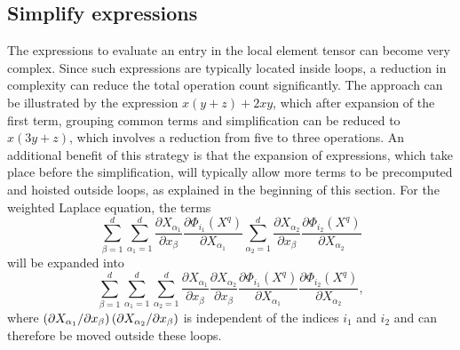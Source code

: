 \subsection{Simplify expressions}
\label{oelgaard-2:sec:simplify_expressions}
%
The expressions to evaluate an entry in the local element tensor can become
very complex. Since such expressions are typically located inside loops,
a reduction in complexity can reduce the total operation count significantly.
The approach can be illustrated by the expression
$x (y + z) + 2 x y$, which after expansion of the first term,
grouping common terms and simplification can be reduced to
$x (3 y + z)$, which involves a reduction from five to three operations.
An additional benefit of this strategy is that the expansion of expressions,
which take place before the simplification, will typically allow more terms to
be precomputed and hoisted outside loops, as explained in the beginning of this
section.
For the weighted Laplace equation, the terms
%
\begin{equation}
  \sum_{\beta=1}^d
  \sum_{\alpha_1=1}^d
    \frac{\partial X_{\alpha_1}}{\partial x_{\beta}}
    \frac{\partial \Phi_{i_1}(X^q)}{\partial X_{\alpha_1}}
  \sum_{\alpha_2=1}^d
    \frac{\partial X_{\alpha_2}}{\partial x_{\beta}}
    \frac{\partial \Phi_{i_2}(X^q)}{\partial X_{\alpha_2}}
\end{equation}
%
will be expanded into
%
\begin{equation}
  \sum_{\beta=1}^d
  \sum_{\alpha_1=1}^d
  \sum_{\alpha_2=1}^d
  \frac{\partial X_{\alpha_1}}{\partial x_{\beta}}
  \frac{\partial X_{\alpha_2}}{\partial x_{\beta}}
  \frac{\partial \Phi_{i_1}(X^q)}{\partial X_{\alpha_1}}
  \frac{\partial \Phi_{i_2}(X^q)}{\partial X_{\alpha_2}},
\end{equation}
%
where
$\left( {\partial X_{\alpha_1} / \partial x_{\beta}} \right)
\left( {\partial X_{\alpha_2} / \partial x_{\beta}} \right)$ is independent of the indices
$i_1$ and $i_2$ and can therefore be moved outside these loops.


